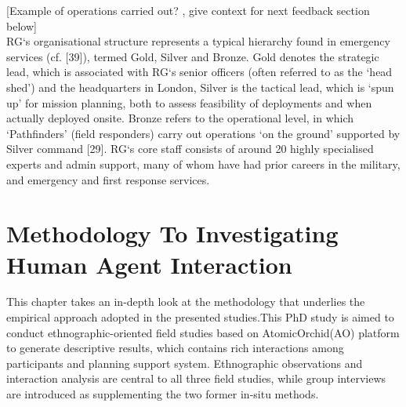 [Example of operations carried out? , give context for next feedback section below]\\

RG`s organisational structure represents a typical hierarchy found in emergency services (cf. [39]), termed Gold, Silver and Bronze. Gold denotes the strategic lead, which is associated with RG`s senior officers (often referred to as the `head shed') and the headquarters in London, Silver is the tactical lead, which is `spun up' for mission planning, both to assess feasibility of deployments and when actually deployed onsite. Bronze refers to the operational level, in which `Pathfinders' (field responders) carry out operations `on the ground' supported by Silver command [29]. RG`s core staff consists of around 20 highly specialised experts and admin support, many of whom have had prior careers in the military, and emergency and first response services.\\






\chapter{ Methodology To Investigating Human Agent Interaction}
This chapter takes an in-depth look at the methodology that underlies the empirical approach adopted in the presented studies.This PhD study is aimed to conduct ethnographic-oriented field studies based on AtomicOrchid(AO) platform to generate descriptive results, which contains rich interactions among participants and planning support system. Ethnographic observations and interaction analysis are central to all three field studies, while group interviews are introduced as supplementing the two former in-situ methods.\\

